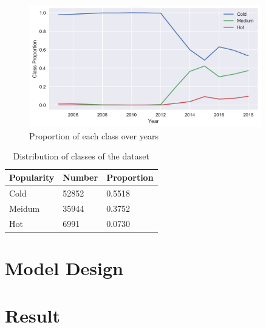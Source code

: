 \begin{figure}
\centering
\includegraphics[width=0.9\textwidth]{proportion_hypes.png}
\caption{Proportion of each class over years}
\label{proportion_yeas}
\end{figure}


\begin{table}[]
\centering
\begin{tabular}{lll}
\multicolumn{1}{c}{Popularity} & \multicolumn{1}{c}{Number} & Proportion \\ \hline
Cold                           & 52852                      & 0.5518     \\
Meidum                         & 35944                      & 0.3752     \\
Hot                            & 6991                       & 0.0730    
\end{tabular}
\caption{Distribution of classes of the dataset}
\label{distribution_classes}
\end{table}




\section{Model Design}

\section{Result}